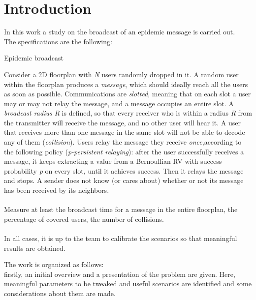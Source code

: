 \chapter{Introduction}

In this work a study on the broadcast of an epidemic message is carried out.\\
The specifications are the following:\\
\begin{displayquote}
\begin{specifications}
{\Large Epidemic broadcast}

Consider a 2D floorplan with \textit{N} users randomly dropped in it. A random user within the floorplan produces a \textit{message}, which should ideally reach all the users as soon as possible. Communications are \textit{slotted},  meaning  that  on  each  slot  a  user  may  or  may  not  relay  the  message,  and  a  message occupies  an  entire  slot.  A \textit{broadcast radius R} is  defined,  so  that  every  receiver  who  is  within  a radius \textit{R} from  the  transmitter  will  receive  the  message,  and no other user will  hear  it.  A  user  that receives more than one message in the same slot will not be able to decode any of them (\textit{collision}).
Users  relay  the  message  they  receive \textit{once},according  to  the  following  policy  (\textit{p-persistent relaying}):  after  the  user  successfully  receives  a  message,  it keeps extracting a  value  from  a Bernoullian RV with success probability \textit{p} on every slot, until it achieves success. Then it relays the message  and  stops. A  sender  does  not  know  (or  cares  about)  whether  or  not  its  message  has  been received by its neighbors.\\
\\
Measure at least the broadcast time for a message in the entire floorplan, the percentage of covered users, the number of collisions.\\
\\
In all cases, it is up to the team to calibrate the scenarios so that meaningful results are obtained.\\
\end{specifications}
\end{displayquote}
The work is organized as follows:\\
firstly, an initial overview and a presentation of the problem are given. Here, meaningful parameters to be tweaked and useful scenarios are identified and some considerations about them are made.\\
